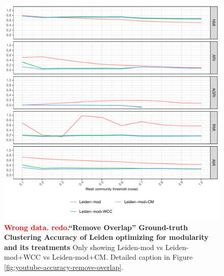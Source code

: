 \documentclass[aps,pre,superscriptaddress]{revtex4}
\begin{document}
\begin{figure}[!htpb]
\centering
\includegraphics[]{figures/remove_overlap_youtube_leiden_mod_accuracy.pdf}
\caption[]{\textbf{\textcolor{red}{Wrong data. redo.}``Remove Overlap'' Ground-truth Clustering Accuracy of Leiden optimizing for modularity and its treatments} Only showing Leiden-mod vs Leiden-mod+WCC vs Leiden-mod+CM. Detailed caption in Figure \ref{fig:youtube-accuracy-remove-overlap}.}
\label{fig:remove-overlap-leiden-mod}
\end{figure}
\end{document}

